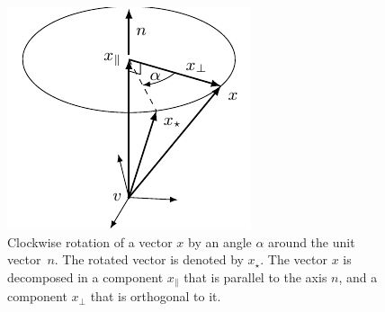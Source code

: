 \begin{figure}
      \centering
      \includegraphics[scale = 1]{figure3_4.pdf}
      \caption[]{Clockwise rotation of a vector $x$ by an angle $\alpha$
        around the unit vector~$n$. The rotated vector is denoted by $x_\star$. The vector $x$ is decomposed in a component $x_\parallel$ that is parallel to the axis $n$, and a component $x_\perp$ that is orthogonal to it.}
      \label{fig:models-axisAngle}
\end{figure}

